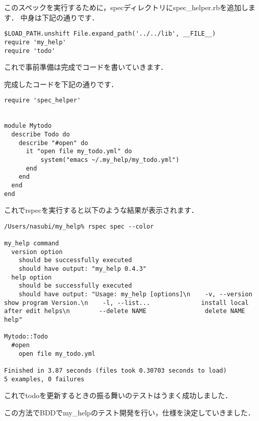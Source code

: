 このスペックを実行するために，specディレクトリにspec\_helper.rbを追加します．
中身は下記の通りです．
\begin{lstlisting}[style=customRuby]
$LOAD_PATH.unshift File.expand_path('../../lib', __FILE__)
require 'my_help'
require 'todo'
\end{lstlisting}
これで事前準備は完成でコードを書いていきます．

完成したコードを下記の通りです．
\begin{lstlisting}[style=customRuby]
require 'spec_helper'


module Mytodo
  describe Todo do
    describe "#open" do
      it "open file my_todo.yml" do
          system("emacs ~/.my_help/my_todo.yml")
      end
    end
  end
end

\end{lstlisting}
これでrspecを実行すると以下のような結果が表示されます．
\begin{lstlisting}[style=customCsh]
/Users/nasubi/my_help% rspec spec --color

my_help command
  version option
    should be successfully executed
    should have output: "my_help 0.4.3"
  help option
    should be successfully executed
    should have output: "Usage: my_help [options]\n    -v, --version                    show program Version.\n    -l, --list...              install local after edit helps\n        --delete NAME                delete NAME help"

Mytodo::Todo
  #open
    open file my_todo.yml

Finished in 3.87 seconds (files took 0.30703 seconds to load)
5 examples, 0 failures

\end{lstlisting}
これでtodoを更新するときの振る舞いのテストはうまく成功しました．

この方法でBDDでmy\_helpのテスト開発を行い，仕様を決定していきました．

